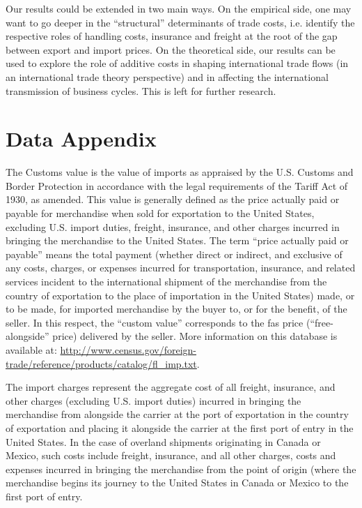 \documentclass[a4paper,11pt]{article}
\begin{document}
Our results could be extended in two main ways. On the empirical side, one may want to go deeper in the ``structural'' determinants of trade costs, i.e. identify the respective roles of handling costs, insurance and freight at the root of the gap between export and import prices. On the theoretical side, our results can be used to explore the role of additive costs in shaping international trade flows (in an international trade theory perspective) and in affecting the international transmission of business cycles. This is left for further research.



\newpage




\newpage


\appendix

\section{Data Appendix \label{app:data}}


The Customs value is the value of imports as appraised by the U.S. Customs and Border Protection in accordance with the legal requirements of the Tariff Act of 1930, as amended. This value is generally defined as the price actually paid or payable for merchandise when sold for exportation to the United States, excluding U.S. import duties, freight, insurance, and other charges incurred in bringing the merchandise to the United States. The term ``price actually paid or payable'' means the total payment (whether direct or indirect, and exclusive of any costs, charges, or expenses incurred for transportation, insurance, and related services incident to the international shipment of the merchandise from the country of exportation to the place of importation in the United States) made, or to be made, for imported merchandise by the buyer to, or for the benefit, of the seller. In this respect, the ``custom value'' corresponds to the fas price (``free-alongside'' price) delivered by the seller. More information on this database is available at: \url{http://www.census.gov/foreign-trade/reference/products/catalog/fl_imp.txt}.

The import charges represent the aggregate cost of all freight, insurance, and other charges (excluding U.S. import duties) incurred in bringing the merchandise from alongside the carrier at the port of exportation in the country of exportation and placing it alongside the carrier at the first port of entry in the United States. In the case of overland shipments originating in Canada or Mexico, such costs include freight, insurance, and all other charges, costs and expenses incurred in bringing the merchandise from the point of origin (where the merchandise begins its journey to the United States in Canada or Mexico to the first port of entry.
\end{document}
